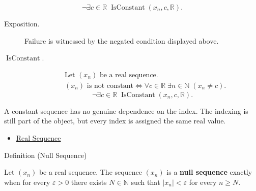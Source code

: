 \begin{remark*}
\[
\neg\exists c \in \mathbb{R}\;
\operatorname{IsConstant}(x_n,c,\mathbb{R}).
\]
\end{remark*}
\begin{remark*}
\begin{description}
  \item[Exposition.]
Failure is witnessed by the negated condition displayed above.
  \item[\(\operatorname{IsConstant}.\)]
\[
\begin{aligned}
&\text{Let } (x_n) \text{ be a real sequence.}\\
&(x_n) \text{ is not constant}
\Longleftrightarrow
\forall c \in \mathbb{R}\;
\exists n \in \mathbb{N}\;(x_n \neq c).
\end{aligned}
\]
\[
\neg\exists c \in \mathbb{R}\;
\operatorname{IsConstant}(x_n,c,\mathbb{R}).
\]
\end{description}
\end{remark*}

\begin{remark*}[Interpretation]
A constant sequence has no genuine dependence on the index. The indexing is
still part of the object, but every index is assigned the same real value.
\end{remark*}

\begin{dependencies}
\begin{itemize}
  \item \hyperref[def:real-sequence]{Real Sequence}
\end{itemize}
\end{dependencies}


\begin{definitionbox}{Definition (Null Sequence)}
\begin{definition}
\label{def:null-sequence}
Let $(x_n)$ be a real sequence. The sequence $(x_n)$ is a
\textbf{null sequence} exactly when for every $\varepsilon > 0$ there exists
$N \in \mathbb{N}$ such that $|x_n| < \varepsilon$ for every $n \ge N$.
\end{definition}
\end{definitionbox}

